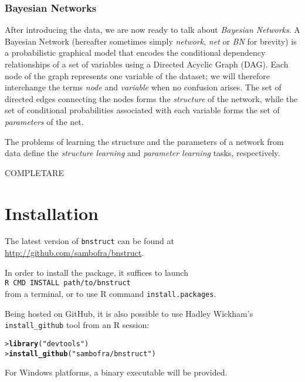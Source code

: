 \documentclass{article}\usepackage[]{graphicx}\usepackage[]{color}
\makeatletter
\newcommand{\hlstr}[1]{\textcolor[rgb]{0.192,0.494,0.8}{#1}}%
\newcommand{\hlstd}[1]{\textcolor[rgb]{0.345,0.345,0.345}{#1}}%
\newcommand{\hlkwd}[1]{\textcolor[rgb]{0.737,0.353,0.396}{\textbf{#1}}}%
\newenvironment{kframe}{%
 \def\at@end@of@kframe{}%
 \ifinner\ifhmode%
  \def\at@end@of@kframe{\end{minipage}}%
  \begin{minipage}{\columnwidth}%
 \fi\fi%
 \def\FrameCommand##1{\hskip\@totalleftmargin \hskip-\fboxsep
 \colorbox{shadecolor}{##1}\hskip-\fboxsep
     \hskip-\linewidth \hskip-\@totalleftmargin \hskip\columnwidth}%
 \MakeFramed {\advance\hsize-\width
   \@totalleftmargin\z@ \linewidth\hsize
   \@setminipage}}%
 {\par\unskip\endMakeFramed%
 \at@end@of@kframe}
\newenvironment{knitrout}{}{} %
\newcommand{\Rpackage}[1]{{\texttt{#1}}}
\makeatother
\begin{document}
\subsubsection{Bayesian Networks}
After introducing the data, we are now ready to talk about \emph{Bayesian Networks}. A Bayesian Network
(hereafter sometimes simply \emph{network}, \emph{net} or \emph{BN} for brevity) is a probabilistic graphical model that encodes
the conditional dependency relationships of a set of variables using a Directed Acyclic Graph (DAG).
Each node of the graph represents one variable of the dataset; we will therefore interchange
the terms \emph{node} and \emph{variable} when no confusion arises. The set of directed edges
connecting the nodes forms the \emph{structure} of the network, while the set of conditional
probabilities associated with each variable forms the set of \emph{parameters} of the net.

The problems of learning the structure and the parameters of a network from data define the
\emph{structure learning} and \emph{parameter learning} tasks, respectively. 

COMPLETARE

\section{Installation}

The latest version of \Rpackage{bnstruct} can be found at \url{http://github.com/sambofra/bnstruct}.

In order to install the package, it suffices to launch\\
\verb!R CMD INSTALL path/to/bnstruct!\\
from a terminal, or to use R command \verb!install.packages!.

Being hosted on GitHub, it is also possible to use Hadley Wickham's \texttt{install\_github} tool from
an R session:
\begin{knitrout}
\color{fgcolor}\begin{kframe}
\begin{alltt}
\hlstd{> }\hlkwd{library}\hlstd{(}\hlstr{"devtools"}\hlstd{)}
\hlstd{> }\hlkwd{install_github}\hlstd{(}\hlstr{"sambofra/bnstruct"}\hlstd{)}
\end{alltt}
\end{kframe}
\end{knitrout}

For Windows platforms, a binary executable will be provided.
\end{document}
